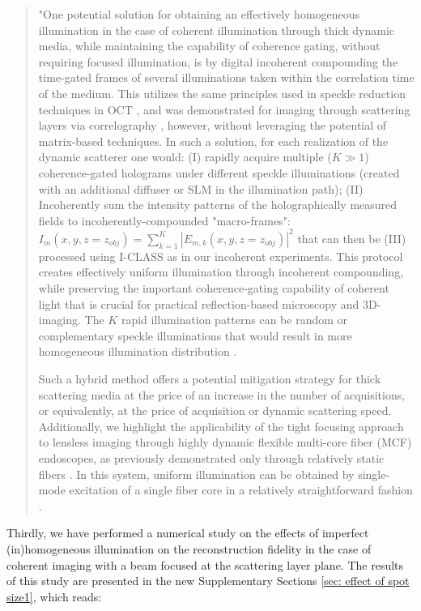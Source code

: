 \documentclass[12pt]{article}
\newenvironment{ourresponse}
    {\begin{tcolorbox}[width=\linewidth,breakable,enhanced,colback=gray!5,colframe=responsecolor!50,title=Response,left=5pt,right=5pt]}
    {\end{tcolorbox}}
\begin{document}
\begin{ourresponse}
\begin{quote}
     "One potential solution for obtaining an effectively homogeneous illumination in the case of coherent illumination through thick dynamic media, while maintaining the capability of coherence gating, without requiring focused illumination, is by digital incoherent compounding the time-gated frames of several illuminations taken within the correlation time of the medium. This utilizes the same principles used in speckle reduction techniques in OCT \cite{liba2017speckle}, and was demonstrated for imaging through scattering layers via correlography \cite{idell1987image, salhov2018depth, metzler2020deepinverse}, however, without leveraging the potential of matrix-based techniques.
     In such a solution, for each realization of the dynamic scatterer one would: (I) rapidly acquire multiple ($K \gg 1$) coherence-gated holograms under different speckle illuminations (created with an additional diffuser or SLM in the illumination path); (II) Incoherently sum the intensity patterns of the holographically measured fields to incoherently-compounded "macro-frames": $I_m(x,y,z=z_{obj}) = \sum_{k=1}^{K}|E_{m,k}(x,y,z=z_{obj})|^2$  that can then be (III) processed using I-CLASS as in our incoherent experiments.
     This protocol creates effectively uniform illumination through incoherent compounding, while preserving the important coherence-gating capability of coherent light that is crucial for practical reflection-based microscopy and 3D-imaging. The $K$ rapid illumination patterns can be random or complementary speckle illuminations that would result in more homogeneous illumination distribution \cite{gateau2017complementary}.

     Such a hybrid method offers a potential mitigation strategy for thick scattering media at the price of an increase in the number of acquisitions, or equivalently, at the price of acquisition or dynamic scattering speed.
     Additionally, we highlight the applicability of the tight focusing approach to lensless imaging through highly dynamic flexible multi-core fiber (MCF) endoscopes, as previously demonstrated only through relatively static fibers \cite{choi2022flexible, haim2025image}. In this system, uniform illumination can be obtained by single-mode excitation of a single fiber core in a relatively straightforward fashion \cite{weinberg2024ptychographic}.
     \end{quote}


Thirdly, we have performed a numerical study on the effects of imperfect (in)homogeneous illumination on the reconstruction fidelity in the case of coherent imaging with a beam focused at the scattering layer plane.
The results of this study are presented in the new Supplementary Sections  \ref{sec: effect of spot size1}, which reads:


\end{ourresponse}
\end{document}
